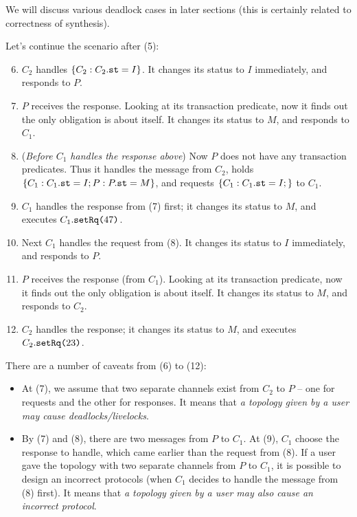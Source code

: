\documentclass[format=manuscript]{acmart}
\begin{document}
We will discuss various deadlock cases in later sections (this is certainly
related to correctness of synthesis).

Let's continue the scenario after (5):

\begin{enumerate}
  \setcounter{enumi}{5}
\item $C_2$ handles $\{ C_2: C_2.\texttt{st} = I \}$. It changes its status to $I$
  immediately, and responds to $P$.
\item $P$ receives the response. Looking at its transaction predicate, now it
  finds out the only obligation is about itself. It changes its status to $M$,
  and responds to $C_1$.
\item (\emph{Before $C_1$ handles the response above}) Now $P$ does not have any
  transaction predicates. Thus it handles the message from $C_2$, holds $\{ C_1:
  C_1.\texttt{st} = I; P: P.\texttt{st} = M \}$, and requests $\{ C_1: C_1.\texttt{st} = I; \}$
  to $C_1$.
\item $C_1$ handles the response from (7) first; it changes its status to $M$,
  and executes $C_1.\texttt{setRq(}47\texttt{)}$.
\item Next $C_1$ handles the request from (8). It changes its status to $I$
  immediately, and responds to $P$.
\item $P$ receives the response (from $C_1$). Looking at its transaction
  predicate, now it finds out the only obligation is about itself. It changes
  its status to $M$, and responds to $C_2$.
\item $C_2$ handles the response; it changes its status to $M$, and executes
  $C_2.\texttt{setRq(}23\texttt{)}$.
\end{enumerate}

There are a number of caveats from (6) to (12):

\begin{itemize}
\item At (7), we assume that two separate channels exist from $C_2$ to $P$ --
  one for requests and the other for responses. It means that \emph{a topology
    given by a user may cause deadlocks/livelocks}.
\item By (7) and (8), there are two messages from $P$ to $C_1$. At (9), $C_1$
  choose the response to handle, which came earlier than the request from (8).
  If a user gave the topology with two separate channels from $P$ to $C_1$, it
  is possible to design an incorrect protocols (when $C_1$ decides to handle the
  message from (8) first). It means that \emph{a topology given by a user may
    also cause an incorrect protocol}.
\end{itemize}
\end{document}
